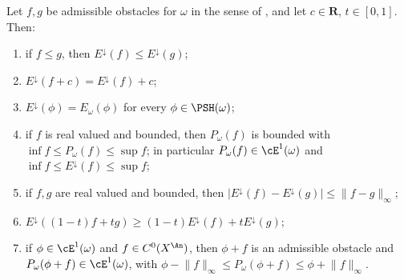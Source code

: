 \begin{proposition}
\label{prop:ch47-F-elementary}
Let $f,g$ be admissible obstacles for $\omega$ in the sense of
, and let $c\in\mathbf R$,
$t\in[0,1]$.  Then:
\begin{enumerate}
\item\label{itm:ch47-F:mono}
      if $f\le g$, then $E^\downarrow(f)\le E^\downarrow(g)$;
\item\label{itm:ch47-F:transl}
      $E^\downarrow(f+c)=E^\downarrow(f)+c$;
\item\label{itm:ch47-F:proj}
      $E^\downarrow(\phi)=E_\omega(\phi)$ for every
      $\phi\in\PSH(\omega)$;
\item\label{itm:ch47-F:bounds}
      if $f$ is real valued and bounded, then $P_\omega(f)$ is bounded
      with $\inf f\le P_\omega(f)\le\sup f$; in particular
      $P_\omega(f)\in\cE^1(\omega)$ and
      $\inf f\le E^\downarrow(f)\le\sup f$;
\item\label{itm:ch47-F:lip}
      if $f,g$ are real valued and bounded, then
      $|E^\downarrow(f)-E^\downarrow(g)|\le\lVert f-g\rVert_\infty$;
\item\label{itm:ch47-F:concave}
      $E^\downarrow((1-t)f+tg)\ge(1-t)E^\downarrow(f)+tE^\downarrow(g)$;
\item\label{itm:ch47-F:e1}
      if $\phi\in\cE^1(\omega)$ and $f\in C^0(X^{\An})$, then
      $\phi+f$ is an admissible obstacle and
      $P_\omega(\phi+f)\in\cE^1(\omega)$, with
      $\phi-\lVert f\rVert_\infty\le P_\omega(\phi+f)\le\phi
      +\lVert f\rVert_\infty$.
\end{enumerate}
\end{proposition}


